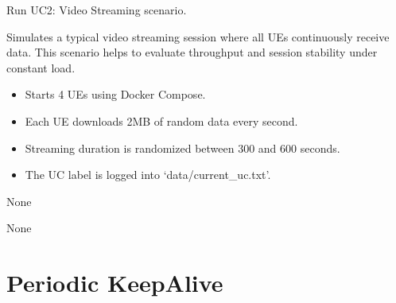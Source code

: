 \documentclass[letterpaper,10pt,english]{sphinxmanual}
\begin{document}
\begin{fulllineitems}
\label{\detokenize{uc2:uc2.run_uc2}}
\pysigstartsignatures
{}
\pysigstopsignatures
\sphinxAtStartPar
Run UC2: Video Streaming scenario.

\sphinxAtStartPar
Simulates a typical video streaming session where all UEs continuously receive data.
This scenario helps to evaluate throughput and session stability under constant load.
\begin{description}
\begin{itemize}
\item {} 
\sphinxAtStartPar
Starts 4 UEs using Docker Compose.

\item {} 
\sphinxAtStartPar
Each UE downloads 2MB of random data every second.

\item {} 
\sphinxAtStartPar
Streaming duration is randomized between 300 and 600 seconds.

\item {} 
\sphinxAtStartPar
The UC label is logged into ‘data/current\_uc.txt’.

\end{itemize}

\sphinxAtStartPar
None

\sphinxAtStartPar
None

\end{description}

\end{fulllineitems}


\sphinxstepscope


\chapter{Periodic Keep\sphinxhyphen{}Alive}
\label{\detokenize{uc3:module-uc3}}\label{\detokenize{uc3:periodic-keep-alive}}\label{\detokenize{uc3::doc}}
\end{document}

